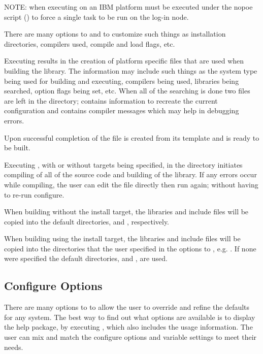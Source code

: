 NOTE: when executing on an IBM platform  must be executed under
the nopoe script () to force a
single task to be run on the log-in node.

There are many options to  and  to customize such
things as installation directories, compilers used, compile and load flags, etc.

Executing  results in the creation of platform specific files
that are used when building the library. The information may include such things
as the system type being used for building and executing, compilers being used,
libraries being searched, option flags being set, etc.  When all of the
searching is done two files are left in the  directory;
 contains information to recreate the current configuration
and  contains compiler messages which may help in debugging
 errors.

Upon successful completion of  the file
 is created from its template
 and \hypre{} is ready to be built.

Executing , with or without targets being specified, in the
 directory initiates compiling of all of the source code and building
of the \hypre{} library.  If any errors occur while compiling, the user can edit
the file  directly then run  again;
without having to re-run configure.

When building \hypre{} without the install target, the libraries and include
files will be copied into the default directories,  and
, respectively.

When building \hypre{} using the install target, the libraries and include files
will be copied into the directories that the user specified in the options to
, e.g. .  If none were specified the
default directories,  and , are
used.


\subsection{Configure Options}\label{config_options}

There are many options to  to allow the user to override and
refine the defaults for any system. The best way to find out what options are
available is to display the help package, by executing , which also includes the usage information.  The user can mix and match
the configure options and variable settings to meet their needs.

